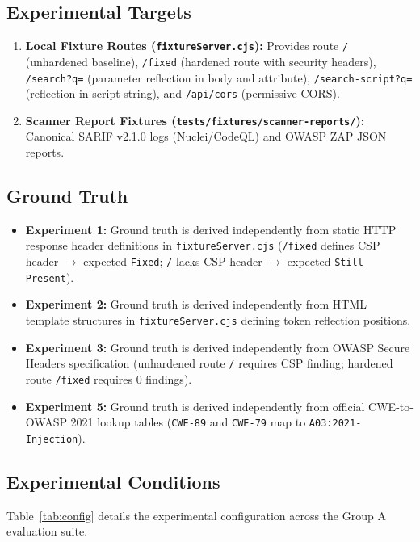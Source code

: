 \documentclass[conference]{IEEEtran}
\begin{document}
\subsection{Experimental Targets}
\begin{enumerate}
    \item \textbf{Local Fixture Routes (\texttt{fixtureServer.cjs}):} Provides route \texttt{/} (unhardened baseline), \texttt{/fixed} (hardened route with security headers), \texttt{/search?q=} (parameter reflection in body and attribute), \texttt{/search-script?q=} (reflection in script string), and \texttt{/api/cors} (permissive CORS).
    \item \textbf{Scanner Report Fixtures (\texttt{tests/fixtures/scanner-reports/}):} Canonical SARIF v2.1.0 logs (Nuclei/CodeQL) and OWASP ZAP JSON reports.
\end{enumerate}

\subsection{Ground Truth}
\begin{itemize}
    \item \textbf{Experiment 1:} Ground truth is derived independently from static HTTP response header definitions in \texttt{fixtureServer.cjs} (\texttt{/fixed} defines CSP header $\rightarrow$ expected \texttt{Fixed}; \texttt{/} lacks CSP header $\rightarrow$ expected \texttt{Still Present}).
    \item \textbf{Experiment 2:} Ground truth is derived independently from HTML template structures in \texttt{fixtureServer.cjs} defining token reflection positions.
    \item \textbf{Experiment 3:} Ground truth is derived independently from OWASP Secure Headers specification (unhardened route \texttt{/} requires CSP finding; hardened route \texttt{/fixed} requires 0 findings).
    \item \textbf{Experiment 5:} Ground truth is derived independently from official CWE-to-OWASP 2021 lookup tables (\texttt{CWE-89} and \texttt{CWE-79} map to \texttt{A03:2021-Injection}).
\end{itemize}

\subsection{Experimental Conditions}
Table~\ref{tab:config} details the experimental configuration across the Group A evaluation suite.
\end{document}
